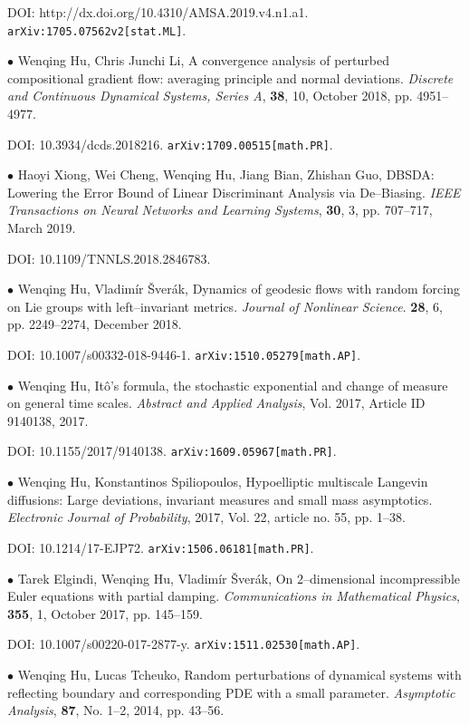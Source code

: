 \documentclass[margin,line]{res}
\begin{document}
\begin{resume}
DOI: http://dx.doi.org/10.4310/AMSA.2019.v4.n1.a1. \verb"arXiv:1705.07562v2[stat.ML]".


$\bullet$ Wenqing Hu, Chris Junchi Li,
A convergence analysis of perturbed compositional gradient flow: averaging principle and normal deviations.
\textit{Discrete and Continuous Dynamical Systems, Series A}, \textbf{38}, 10, October 2018, pp. 4951--4977.

DOI: 10.3934/dcds.2018216. \verb"arXiv:1709.00515[math.PR]".


$\bullet$ Haoyi Xiong, Wei Cheng, Wenqing Hu, Jiang Bian, Zhishan Guo,
DBSDA: Lowering the Error Bound of Linear Discriminant Analysis via De--Biasing.
\textit{IEEE Transactions on Neural Networks and Learning Systems}, \textbf{30}, 3, pp. 707--717, March 2019.

DOI: 10.1109/TNNLS.2018.2846783.

$\bullet$ Wenqing Hu, Vladim\'{i}r \v{S}ver\'{a}k, Dynamics of
geodesic flows with random forcing on Lie groups with
left--invariant metrics. \textit{Journal of Nonlinear Science}. \textbf{28}, 6, pp. 2249--2274, December 2018.

DOI: 10.1007/s00332-018-9446-1. \verb"arXiv:1510.05279[math.AP]".


$\bullet$ Wenqing Hu, It\^{o}'s formula, the stochastic exponential and change of
measure on general time scales. \textit{Abstract and Applied Analysis},
Vol. 2017, Article ID 9140138, 2017. 

DOI: 10.1155/2017/9140138. \verb"arXiv:1609.05967[math.PR]".


$\bullet$ Wenqing Hu, Konstantinos Spiliopoulos, Hypoelliptic
multiscale Langevin diffusions: Large deviations, invariant measures
and small mass asymptotics. \textit{Electronic Journal of Probability}, 2017, Vol. 22,
article no. 55, pp. 1--38. 

DOI: 10.1214/17-EJP72. \verb"arXiv:1506.06181[math.PR]".


$\bullet$ Tarek Elgindi, Wenqing Hu, Vladim\'{i}r \v{S}ver\'{a}k, On
$2$--dimensional incompressible Euler equations with partial
damping. \textit{Communications in Mathematical Physics}, \textbf{355}, 1, October 2017, pp. 145--159. 

DOI: 10.1007/s00220-017-2877-y. \verb"arXiv:1511.02530[math.AP]".


$\bullet$ Wenqing Hu, Lucas Tcheuko, Random perturbations of
dynamical systems with reflecting boundary and corresponding PDE
with a small parameter. \textit{Asymptotic Analysis}, \textbf{87},
No. 1--2, 2014, pp. 43--56. 


\end{resume}
\end{document}
